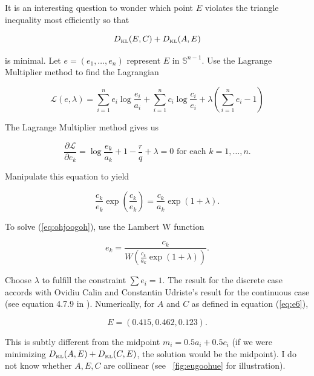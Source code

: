 \documentclass[phd,12pt,oneside]{ubcthesis}
\begin{document}
It is an interesting question to wonder which point $E$ violates the
triangle inequality most efficiently so that

\begin{equation}
  \label{eq:eaghaidu}
D_{\mbox{\tiny KL}}(E,C)+D_{\mbox{\tiny KL}}(A,E)  
\end{equation}

{\noindent}is minimal. Let $e=(e_{1},\ldots,e_{n})$ represent $E$ in
$\mathbb{S}^{n-1}$. Use the Lagrange Multiplier method to find the
Lagrangian

\begin{equation}
  \label{eq:eiweehee}
  \mathcal{L}(e,\lambda)=\sum_{i=1}^{n}e_{i}\log\frac{e_{i}}{a_{i}}+\sum_{i=1}^{n}c_{i}\log\frac{c_{i}}{e_{i}}+\lambda\left(\sum_{i=1}^{n}e_{i}-1\right)
\end{equation}

{\noindent}The Lagrange Multiplier method gives us

\begin{equation}
  \label{eq:nainguji}
  \frac{\partial\mathcal{L}}{\partial{}e_{k}}=\log\frac{e_{k}}{a_{k}}+1-\frac{r}{q}+\lambda=0\mbox{ for each }k=1,{\ldots},n.
\end{equation}

{\noindent}Manipulate this equation to yield

\begin{equation}
  \label{eq:ohjoogoh}
  \frac{c_{k}}{e_{k}}\exp\left(\frac{c_{k}}{e_{k}}\right)=\frac{c_{k}}{a_{k}}\exp(1+\lambda).
\end{equation}

{\noindent}To solve (\ref{eq:ohjoogoh}), use the Lambert W function

\begin{equation}
  \label{eq:ouquuzoh}
  e_{k}=\frac{c_{k}}{W\left(\frac{c_{k}}{a_{k}}\exp(1+\lambda)\right)}.
\end{equation}

{\noindent}Choose $\lambda$ to fulfill the constraint $\sum{}e_{i}=1$. The
result for the discrete case accords with Ovidiu Calin and Constantin
Udriste's result for the continuous case (see equation 4.7.9 in
). Numerically, for $A$ and $C$ as
defined in equation (\ref{eq:e6}),

\begin{equation}
  \label{eq:aemaujei}
  E=(0.415,0.462,0.123).
\end{equation}

{\noindent}This is subtly different from the midpoint $m_{i}=0.5a_{i}+0.5c_{i}$
(if we were minimizing
$D_{\mbox{\tiny KL}}(A,E)+D_{\mbox{\tiny KL}}(C,E)$, the solution
would be the midpoint). I do not know whether $A,E,C$ are collinear
(see {\igure}~\ref{fig:eugoohue} for illustration).
\end{document}
